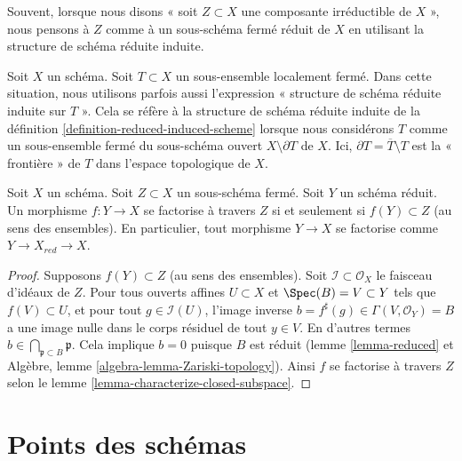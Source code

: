 \noindent
Souvent, lorsque nous disons « soit $Z \subset X$ une composante irréductible de $X$ »,
nous pensons à $Z$ comme à un sous-schéma fermé réduit de $X$ en utilisant la structure de schéma
réduite induite.

\begin{remark}
\label{remark-reduced-induced-locally-closed}
Soit $X$ un schéma. Soit $T \subset X$ un sous-ensemble localement fermé.
Dans cette situation, nous utilisons parfois aussi l'expression
« structure de schéma réduite induite sur $T$ ». Cela se
réfère à la structure de schéma réduite induite
de la définition \ref{definition-reduced-induced-scheme}
lorsque nous considérons $T$ comme un sous-ensemble fermé du
sous-schéma ouvert $X \setminus \partial T$ de
$X$. Ici, $\partial T = \overline{T} \setminus T$ est la « frontière » de
$T$ dans l'espace topologique de $X$.
\end{remark}

\begin{lemma}
\label{lemma-map-into-reduction}
Soit $X$ un schéma. Soit
$Z \subset X$ un sous-schéma fermé. Soit $Y$
un schéma réduit. Un morphisme
$f : Y \to X$ se factorise à travers $Z$ si et seulement si $f(Y)
\subset Z$ (au sens des ensembles). En particulier, tout
morphisme $Y \to X$ se factorise comme $Y \to X_{red} \to X$.
\end{lemma}

\begin{proof}
Supposons $f(Y) \subset Z$ (au sens des ensembles).
Soit $\mathcal{I} \subset \mathcal{O}_X$ le faisceau d'idéaux de $Z$.
Pour tous ouverts affines $U \subset X$ et $\Spec(B) = V \subset Y$
tels que $f(V) \subset U$, et pour tout $g \in \mathcal{I}(U)$,
l'image inverse $b = f^\sharp(g) \in \Gamma(V, \mathcal{O}_Y) =
B$ a une image nulle dans le corps résiduel de tout $y \in
V$. En d'autres termes $b \in \bigcap_{\mathfrak p \subset B} \mathfrak
p$. Cela implique $b = 0$ puisque $B$ est réduit (lemme \ref{lemma-reduced} et
Algèbre, lemme \ref{algebra-lemma-Zariski-topology}). Ainsi
$f$ se factorise à travers
$Z$ selon le lemme \ref{lemma-characterize-closed-subspace}.
\end{proof}










\section{Points des schémas}
\label{section-points}

